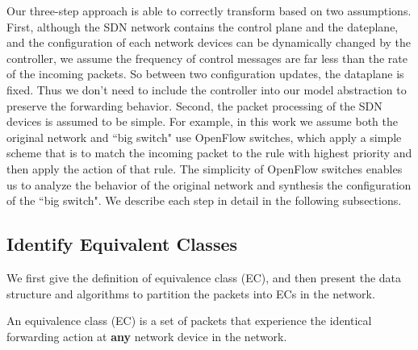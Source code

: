 Our three-step approach is able to correctly transform based on two assumptions. First, although the SDN network contains the control plane and the dateplane, and the configuration of each network devices can be dynamically changed by the controller, we assume the frequency of control messages are far less than the rate of the incoming packets. So between two configuration updates, the dataplane is fixed. Thus we don't need to include the controller into our model abstraction to preserve the forwarding behavior. Second, the packet processing of the SDN devices is assumed to be simple. For example, in this work we assume both the original network and ``big switch" use OpenFlow switches, which apply a simple scheme that is to match the incoming packet to the rule with highest priority and then apply the action of that rule. The simplicity of OpenFlow switches enables us to analyze the behavior of the original network and synthesis the configuration of the ``big switch". We describe each step in detail in the following subsections.
   
\subsection{Identify Equivalent Classes}

We first give the definition of equivalence class (EC), and then present the data structure and algorithms to partition the packets into ECs in the network.

\begin{definition}
An equivalence class (EC) is a set of packets that experience the identical forwarding action at \textbf{any} network device in the network. 
\label{Def:EC}
\end{definition}

